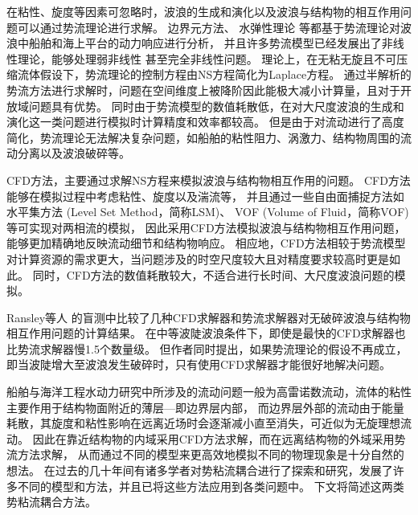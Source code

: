 在粘性、旋度等因素可忽略时，波浪的生成和演化以及波浪与结构物的相互作用问题可以通过势流理论进行求解。%
边界元方法\cite{hessCalculationNonliftingPotential1964,贺JianDanGreenHanShuFaQiuJieSanWeiShuiDongLiXiShu1986}、%
水弹性理论\cite{priceHydroelasticityMarineStructures1985,田ChuanBoShuiDanXingLiXueLiLunDeYanJiuJinZhan2008}%
等都基于势流理论对波浪中船舶和海上平台的动力响应进行分析，%
并且许多势流模型已经发展出了非线性理论，能够处理弱非线性\cite{袁ShenHaiFuShiJieGouWuXiBoXiTongDeFeiXianXingShiYuFenXi2011}%
甚至完全非线性\cite{sunTwoDimensionalFully2012a}问题。%
理论上，在无粘无旋且不可压缩流体假设下，势流理论的控制方程由NS方程简化为Laplace方程。%
通过半解析的势流方法进行求解时，问题在空间维度上被降阶因此能极大减小计算量，且对于开放域问题具有优势。%
同时由于势流模型的数值耗散低，在对大尺度波浪的生成和演化这一类问题进行模拟时计算精度和效率都较高。%
但是由于对流动进行了高度简化，势流理论无法解决复杂问题，如船舶的粘性阻力、涡激力、结构物周围的流动分离以及波浪破碎等。%

CFD方法，主要通过求解NS方程来模拟波浪与结构物相互作用的问题。%
CFD方法能够在模拟过程中考虑粘性、旋度以及湍流等，%
并且通过一些自由面捕捉方法如水平集方法\cite{sussmanLevelSetApproach1994} (Level Set Method，简称LSM)、%
VOF\cite{hirtVolumeFluidVOF1981} (Volume of Fluid，简称VOF)等可实现对两相流的模拟，%
因此采用CFD方法模拟波浪与结构物相互作用问题，%
能够更加精确地反映流动细节和结构物响应\cite{tezdoganFullscaleUnsteadyRANS2015,oggianoReproductionSteepLong2017,songValidationCFDApproach2020}。%
相应地，CFD方法相较于势流模型对计算资源的需求更大，当问题涉及的时空尺度较大且对精度要求较高时更是如此。%
同时，CFD方法的数值耗散较大，不适合进行长时间、大尺度波浪问题的模拟。%

Ransley等人\cite{ransleyBlindComparativeStudy2019,ransleyBlindComparativeStudy2020}%
的盲测中比较了几种CFD求解器和势流求解器对无破碎波浪与结构物相互作用问题的计算结果。%
在中等波陡波浪条件下，即使是最快的CFD求解器也比势流求解器慢1.5个数量级。%
但作者同时提出，如果势流理论的假设不再成立，即当波陡增大至波浪发生破碎时，只有使用CFD求解器才能很好地解决问题。%

船舶与海洋工程水动力研究中所涉及的流动问题一般为高雷诺数流动，流体的粘性主要作用于结构物面附近的薄层—即边界层内部，%
而边界层外部的流动由于能量耗散，其旋度和粘性影响在远离近场时会逐渐减小直至消失，可近似为无旋理想流动。%
因此在靠近结构物的内域采用CFD方法求解，而在远离结构物的外域采用势流方法求解，%
从而通过不同的模型来更高效地模拟不同的物理现象是十分自然的想法。%
在过去的几十年间有诸多学者对势粘流耦合进行了探索和研究，发展了许多不同的模型和方法，并且已将这些方法应用到各类问题中。%
下文将简述这两类势粘流耦合方法。%

